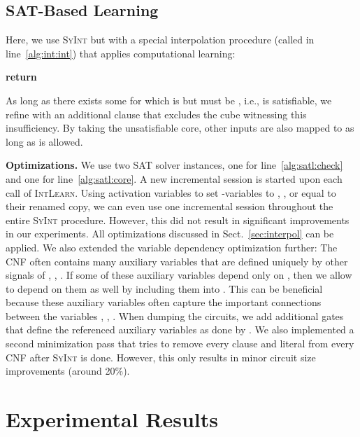 \documentclass[conference]{IEEEtran}
\begin{document}
         
\subsection{SAT-Based Learning} \label{sec:satlearn}

Here, we use \textsc{SyInt} but with a special interpolation procedure (called 
in line~\ref{alg:int:int}) that applies computational learning:
\begin{algorithmic}[1]
  \State 
          \label{alg:satl:check}
      \State 
      \label{alg:satl:core}
    \EndWhile
    \State \textbf{return} 
\EndProcedure
\end{algorithmic}
As long as there exists some  for which  is  but must be 
, i.e.,  is satisfiable, we refine  with an additional 
clause that excludes the cube  witnessing this insufficiency.  By 
taking the unsatisfiable core, other inputs are also mapped to  as long 
as  is allowed.

\textbf{Optimizations.}
We use two SAT solver instances, one for line~\ref{alg:satl:check} and one for 
line~\ref{alg:satl:core}.  A new incremental session is started upon each call 
of \textsc{IntLearn}.  Using activation variables to set 
-variables to , , or equal to their renamed copy, 
we can even use one incremental session throughout the entire \textsc{SyInt} 
procedure. However, this did not result in significant improvements in our 
experiments.  All optimizations discussed in Sect.~\ref{sec:interpol} can be 
applied.  We also extended the variable dependency optimization further:  The 
CNF  often contains many auxiliary variables that are defined uniquely by 
other signals of , , .  If some of 
these auxiliary variables depend only on , then we allow  to 
depend on them as well by including them into .  This can be 
beneficial because these auxiliary variables often capture the important 
connections between the variables , , 
.  When dumping the circuits, we add additional gates that define 
the referenced auxiliary variables as done by .  We also implemented a second 
minimization pass that tries to remove every clause and literal from every CNF 
 after \textsc{SyInt} is done.  However, this only results in minor circuit 
size improvements (around 20\%).

\section{Experimental Results} \label{sec:exp}
\end{document}
